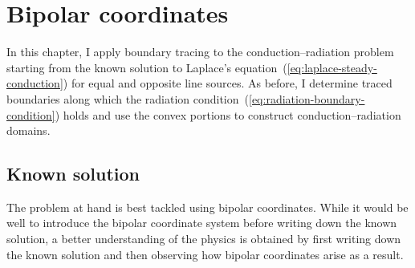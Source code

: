 \chapter{Bipolar coordinates}
\label{ch:bipolar}

In this chapter,
I apply boundary tracing to the conduction--radiation problem
starting from the known solution
to Laplace's equation~(\ref{eq:laplace-steady-conduction})
for equal and opposite line sources.
As before,
I determine traced boundaries along which
the radiation condition~(\ref{eq:radiation-boundary-condition}) holds
and use the convex portions to construct conduction--radiation domains.

\section{Known solution}
\label{sec:bipolar.known}

The problem at hand is best tackled using bipolar coordinates.
While it would be well to introduce the bipolar coordinate system
before writing down the known solution,
a better understanding of the physics is obtained
by first writing down the known solution
and then observing how bipolar coordinates arise as a result.

